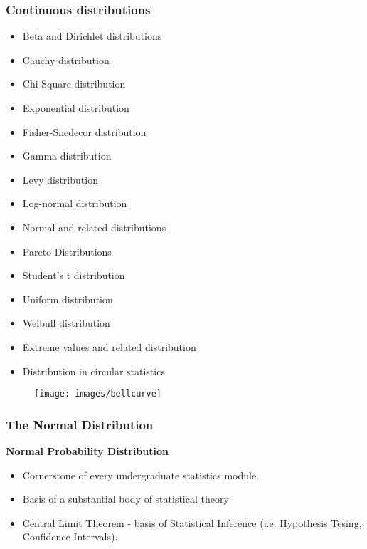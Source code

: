 \documentclass[MAIN.tex]{subfiles}
\begin{document}
\begin{frame}
\frametitle{Continuous distributions}
\begin{itemize}
\item Beta and Dirichlet distributions
\item Cauchy distribution
\item Chi Square distribution
\item Exponential distribution
\item Fisher-Snedecor distribution
\item Gamma distribution
\item Levy distribution
\item Log-normal distribution
\item Normal and related distributions
\item Pareto Distributions
\item Student's t distribution
\item Uniform distribution
\item Weibull distribution
\item Extreme values and related distribution
\item Distribution in circular statistics
\end{itemize}
\end{frame}
\begin{frame}
	\begin{figure}
		\centering
		\texttt{[image: images/bellcurve]}
	\end{figure}

\end{frame}
\begin{frame}
\frametitle{The Normal Distribution}
\textbf{Normal Probability Distribution}
\large
\begin{itemize}
\item Cornerstone of every undergraduate statistics module.
\item Basis of a substantial body of statistical theory
\item Central Limit Theorem - basis of Statistical Inference (i.e. Hypothesis Tesing, Confidence Intervals).

\end{itemize}
\end{frame}
\end{document}
